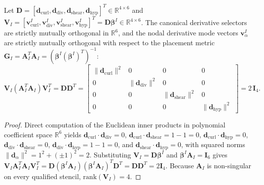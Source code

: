 \documentclass[VANCOUVER,Times1COL]{WileyNJD-v5}
\begin{document}
\begin{lemma}
    Let $\mathbf{D} = [\mathbf{d}_{\mathrm{curl}}, \mathbf{d}_{\mathrm{div}}, \mathbf{d}_{\mathrm{shear}}, \mathbf{d}_{\mathrm{hyp}}]^T \in \mathbb{R}^{4 \times 6}$ and $\mathbf{V}_I = [\mathbf{v}_{\mathrm{curl}}^I, \mathbf{v}_{\mathrm{div}}^I, \mathbf{v}_{\mathrm{shear}}^I, \mathbf{v}_{\mathrm{hyp}}^I]^T = \mathbf{D} \boldsymbol{\beta}^I \in \mathbb{R}^{4 \times 6}$. The canonical derivative selectors are strictly mutually orthogonal in $\mathbb{R}^6$, and the nodal derivative mode vectors $\mathbf{v}_\alpha^I$ are strictly mutually orthogonal with respect to the placement metric $\mathbf{G}_I = \mathbf{A}_I^T \mathbf{A}_I = (\boldsymbol{\beta}^I (\boldsymbol{\beta}^I)^T)^{-1}$:
    \begin{equation}
        \mathbf{V}_I (\mathbf{A}_I^T \mathbf{A}_I) \mathbf{V}_I^T = \mathbf{D} \mathbf{D}^T =
        \begin{bmatrix}
            \|\mathbf{d}_{\mathrm{curl}}\|^2 & 0                               & 0                                 & 0                               \\
            0                                & \|\mathbf{d}_{\mathrm{div}}\|^2 & 0                                 & 0                               \\
            0                                & 0                               & \|\mathbf{d}_{\mathrm{shear}}\|^2 & 0                               \\
            0                                & 0                               & 0                                 & \|\mathbf{d}_{\mathrm{hyp}}\|^2
        \end{bmatrix}
        = 2 \, \mathbf{I}_4.
        \label{eq:orthogonality_gram_matrix}
    \end{equation}
\end{lemma}
\begin{proof}
    Direct computation of the Euclidean inner products in polynomial coefficient space $\mathbb{R}^6$ yields $\mathbf{d}_{\mathrm{curl}} \cdot \mathbf{d}_{\mathrm{div}} = 0$, $\mathbf{d}_{\mathrm{curl}} \cdot \mathbf{d}_{\mathrm{shear}} = 1 - 1 = 0$, $\mathbf{d}_{\mathrm{curl}} \cdot \mathbf{d}_{\mathrm{hyp}} = 0$, $\mathbf{d}_{\mathrm{div}} \cdot \mathbf{d}_{\mathrm{shear}} = 0$, $\mathbf{d}_{\mathrm{div}} \cdot \mathbf{d}_{\mathrm{hyp}} = 1 - 1 = 0$, and $\mathbf{d}_{\mathrm{shear}} \cdot \mathbf{d}_{\mathrm{hyp}} = 0$, with squared norms $\|\mathbf{d}_\alpha\|^2 = 1^2 + (\pm 1)^2 = 2$. Substituting $\mathbf{V}_I = \mathbf{D}\boldsymbol{\beta}^I$ and $\boldsymbol{\beta}^I \mathbf{A}_I = \mathbf{I}_6$ gives $\mathbf{V}_I \mathbf{A}_I^T \mathbf{A}_I \mathbf{V}_I^T = \mathbf{D}(\boldsymbol{\beta}^I \mathbf{A}_I)(\boldsymbol{\beta}^I \mathbf{A}_I)^T \mathbf{D}^T = \mathbf{D}\mathbf{D}^T = 2\mathbf{I}_4$. Because $\mathbf{A}_I$ is non-singular on every qualified stencil, $\mathrm{rank}(\mathbf{V}_I) = 4$.
\end{proof}
\end{document}
